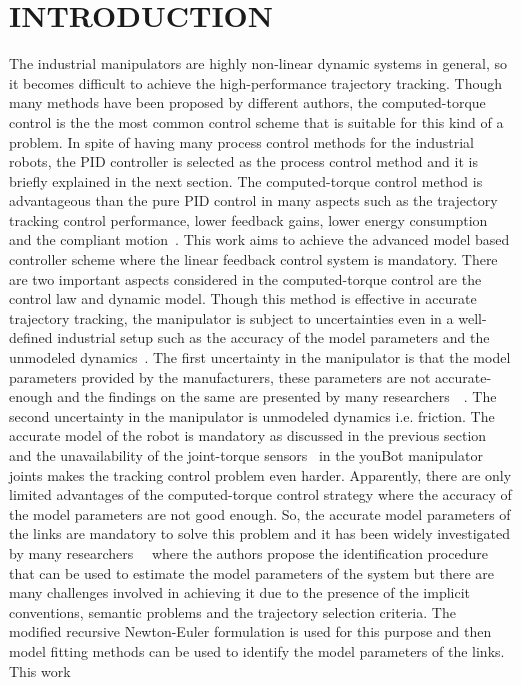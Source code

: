
\chapter{INTRODUCTION}

The industrial manipulators are highly non-linear dynamic systems in general, so it becomes difficult to achieve the high-performance trajectory tracking. Though many methods have been proposed by different authors, the computed-torque control is the the most common control scheme that is suitable for this kind of a problem. In spite of having many process control methods for the industrial robots, the PID controller is selected as the process control method and it is briefly explained in the next section. The computed-torque control method is advantageous than the pure PID control in many aspects such as the trajectory tracking control performance, lower feedback gains, lower energy consumption and the compliant motion~\cite{4586493}. This work aims to achieve the advanced model based controller scheme where the linear feedback control system is mandatory. There are two important aspects considered in the computed-torque control are the control law and dynamic model. Though this method is effective in accurate trajectory tracking, the manipulator is subject to uncertainties even in a well-defined industrial setup such as the accuracy of the model parameters and the unmodeled dynamics~\cite{trajectorytracking_nn}. The first uncertainty in the manipulator is that the model parameters provided by the manufacturers, these parameters are not accurate-enough and the findings on the same are presented by many researchers~\cite{muggler2013torque}~\cite{Atkeson}. The second uncertainty in the manipulator is unmodeled dynamics i.e. friction. The accurate model of the robot is mandatory as discussed in the previous section and the unavailability of the joint-torque sensors~\cite{torquecontrol} in the youBot manipulator joints makes the tracking control problem even harder. Apparently, there are only limited advantages of the computed-torque control strategy where the accuracy of the model parameters are not good enough. So, the accurate model parameters of the links are mandatory to solve this problem and it has been widely investigated by many researchers~\cite{Atkeson}~\cite{swevers} where the authors propose the identification procedure that can be used to estimate the model parameters of the system but there are many challenges involved in achieving it due to the presence of the implicit conventions, semantic problems and the trajectory selection criteria. The modified recursive Newton-Euler formulation is used for this purpose and then model fitting methods can be used to identify the model parameters of the links. This work 